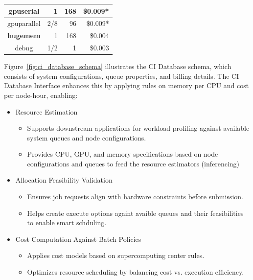 \begin{table}[]
\begin{tabular}{|crrr|}
\multicolumn{1}{|c|}{gpuserial} & \multicolumn{1}{r|}{1} & \multicolumn{1}{r|}{168} & \$0.009* \\ \hline
\multicolumn{1}{|c|}{gpuparallel} & \multicolumn{1}{r|}{2/8} & \multicolumn{1}{r|}{96} & \$0.009* \\ \hline
\multicolumn{1}{|c|}{\textbf{hugemem}} & \multicolumn{1}{r|}{1} & \multicolumn{1}{r|}{168} & \$0.004 \\ \hline
\multicolumn{1}{|c|}{debug} & \multicolumn{1}{r|}{1/2} & \multicolumn{1}{r|}{1} & \$0.003 \\ \hline
\end{tabular}
\end{table}

Figure~\ref{fig:ci_database_schema} illustrates the CI Database schema, which consists of system configurations, queue properties, and billing details. The CI Database Interface enhances this by applying rules on memory per CPU and cost per node-hour, enabling:

\begin{itemize}
    \item Resource Estimation
    \begin{itemize}
        \item Supports downstream applications for workload profiling against available system queues and node configurations. 
        \item Provides CPU, GPU, and memory specifications based on node configurations and queues to feed the resource estimators (inferencing)  
    \end{itemize}
    \item Allocation Feasibility Validation
    \begin{itemize}
        \item Ensures job requests align with hardware constraints before submission.
        \item Helps create execute options againt avaible queues and their feasibilities to enable smart schduling.
    \end{itemize}
    \item Cost Computation Against Batch Policies
    \begin{itemize}
        \item Applies cost models based on supercomputing center rules.
        \item Optimizes resource scheduling by balancing cost vs. execution efficiency.
    \end{itemize}
\end{itemize}


